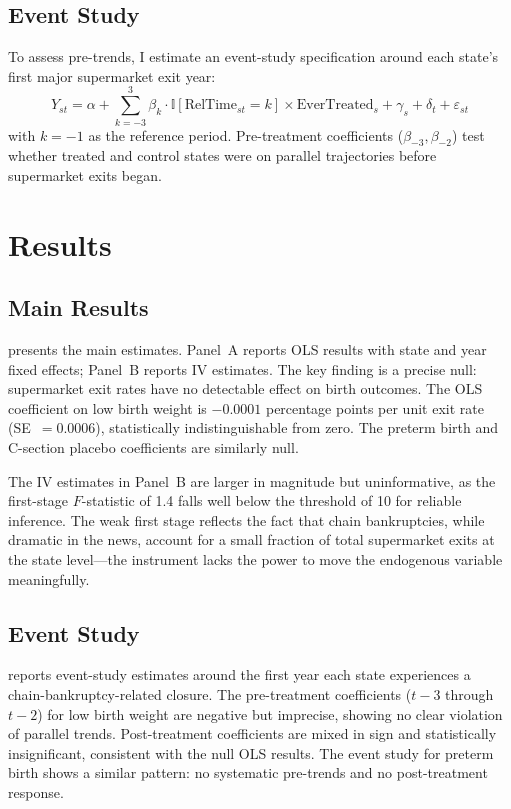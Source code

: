 \documentclass[12pt]{article}
\newcommand{\ind}{\mathbb{I}}
\begin{document}
\subsection{Event Study}

To assess pre-trends, I estimate an event-study specification around each state's first major supermarket exit year:
\begin{equation}
Y_{st} = \alpha + \sum_{k=-3}^{3} \beta_k \cdot \ind[\text{RelTime}_{st} = k] \times \text{EverTreated}_s + \gamma_s + \delta_t + \varepsilon_{st}
\end{equation}
with $k = -1$ as the reference period. Pre-treatment coefficients ($\beta_{-3}, \beta_{-2}$) test whether treated and control states were on parallel trajectories before supermarket exits began.

\section{Results}
\label{sec:results}

\subsection{Main Results}

 presents the main estimates. Panel~A reports OLS results with state and year fixed effects; Panel~B reports IV estimates. The key finding is a precise null: supermarket exit rates have no detectable effect on birth outcomes. The OLS coefficient on low birth weight is $-0.0001$ percentage points per unit exit rate (SE~$= 0.0006$), statistically indistinguishable from zero. The preterm birth and C-section placebo coefficients are similarly null.

The IV estimates in Panel~B are larger in magnitude but uninformative, as the first-stage $F$-statistic of 1.4 falls well below the \citet{stock2005testing} threshold of 10 for reliable inference. The weak first stage reflects the fact that chain bankruptcies, while dramatic in the news, account for a small fraction of total supermarket exits at the state level---the instrument lacks the power to move the endogenous variable meaningfully.



\subsection{Event Study}

 reports event-study estimates around the first year each state experiences a chain-bankruptcy-related closure. The pre-treatment coefficients ($t-3$ through $t-2$) for low birth weight are negative but imprecise, showing no clear violation of parallel trends. Post-treatment coefficients are mixed in sign and statistically insignificant, consistent with the null OLS results. The event study for preterm birth shows a similar pattern: no systematic pre-trends and no post-treatment response.
\end{document}
